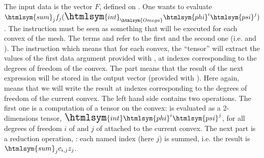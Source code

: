 \documentclass[11pt,a4paper]{article}
\newcommand{\phi}{\htmlsym{phi}}
\newcommand{\psi}{\htmlsym{psi}}
\newcommand{\Omega}{\htmlsym{Omega}}
\newcommand{\sum}{\htmlsym{sum}}
\newcommand{\int}{{\Large\htmlsym{int}}}
\begin{document}
The input data is the vector $F$, defined on . One wants to
evaluate $\sum_{j}f_j(\int_\Omega\phi^i\psi^j)$. The instruction must be seen as
something that will be executed for each convex of the mesh. The terms
 and  refer to the first  and the second one
(i.e.  and ).  The instruction 
which means that for each convex, the ``tensor''  will extract
the values of the first data argument provided with ,
at indexes corresponding to the degrees of freedom of the convex. The
part  means that the result of the next expression will be
stored in the output vector (provided with ). Here
again,  means that we will write the result at indexes
corresponding to the degrees of freedom of the current convex. The
left hand side  contains
two operations. The first one is a computation of a tensor on the
convex:  is evaluated as a
2-dimensions tensor, $\int\phi^i\psi^j$, for all degrees of freedom $i$ of  and $j$ of  attached to the current convex. The next
part is a reduction operation, : each named index
(here $j$) is summed, i.e. the result is $\sum_jc_{i,j}z_j$.
\end{document}
